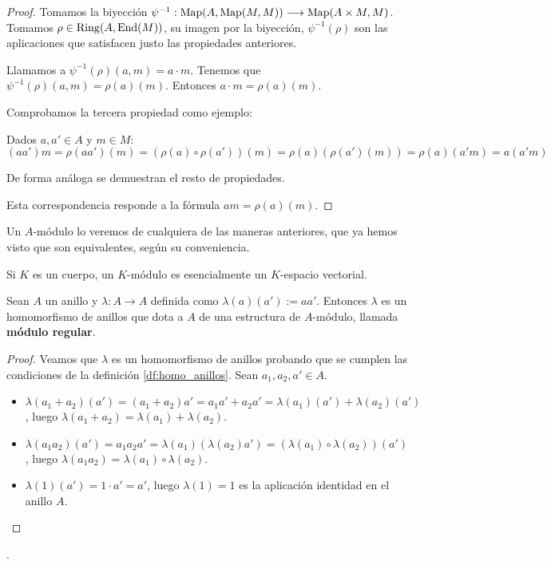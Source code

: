 \begin{proof}
  Tomamos la biyección \(\psi^{-1}:\operatorname{Map}(A,\operatorname{Map}(M,M))\longrightarrow
  \operatorname{Map}(A\times M,M)\).
  Tomamos \(\rho\in\operatorname{Ring}(A,\operatorname{End}(M))\), su imagen por la biyección,
  \(\psi^{-1}(\rho)\)
  son las aplicaciones que satisfacen justo las propiedades
  anteriores.

  Llamamos a \(\psi^{-1}(\rho)(a,m)=a\cdot m\). Tenemos que
  \(\psi^{-1}(\rho)(a,m)=\rho(a)(m)\). Entonces
  \(a\cdot m=\rho(a)(m)\).

  Comprobamos la tercera propiedad como ejemplo:

  Dados \(a, a'\in A\) y \(m\in M\):
  \[
    (aa')m=\rho(aa')(m)=(\rho(a)\circ\rho(a'))(m)
    =\rho(a)(\rho(a')(m))=\rho(a)(a'm)=a(a'm)
  \]

  De forma análoga se demuestran el resto de propiedades.

  Esta correspondencia responde a la fórmula \(am=\rho(a)(m)\).
\end{proof}

Un \(A\)-módulo lo veremos de cualquiera de las maneras anteriores, que
ya hemos visto que son equivalentes, según su conveniencia.

\begin{ejemplo}
  Si \(K\) es un cuerpo, un \(K\)-módulo es esencialmente
  un \(K\)-espacio vectorial.
\end{ejemplo}

\begin{ejemplo}
  Sean \(A\) un anillo y  \(\lambda:A\longrightarrow A\) definida como
  \(\lambda(a)(a'):=aa'\). Entonces \(\lambda\) es un homomorfismo de anillos que
  dota a \(A\) de una estructura de \(A\)-módulo, llamada \textbf{módulo regular}.
\end{ejemplo}
\begin{proof}
  Veamos que \(\lambda\) es un homomorfismo de
  anillos probando que se cumplen las condiciones de la definición \ref{df:homo_anillos}.
  Sean \(a_1, a_2, a' \in A\).
  \begin{itemize}
  \item \(\lambda(a_1+a_2)(a') = (a_1+a_2)a' = a_1a' + a_2a' = \lambda(a_1)(a') +
    \lambda(a_2)(a')\), luego \(\lambda(a_1 + a_2) = \lambda(a_1) + \lambda(a_2)\).
  \item \(\lambda(a_1a_2)(a') = a_1a_2a' = \lambda(a_1)(\lambda(a_2)a') =
    (\lambda(a_1) \circ \lambda(a_2))(a')\), luego \(\lambda(a_1a_2) =
    \lambda(a_1) \circ \lambda(a_2)\).
  \item \(\lambda(1)(a') = 1 \cdot a' = a'\), luego \(\lambda(1) = 1\) es la aplicación
    identidad en el anillo \(A\).
  \end{itemize}
\end{proof}.

